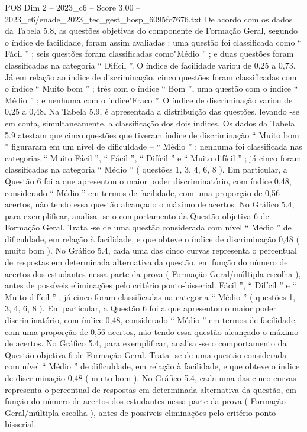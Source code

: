 \begin{textsample}{POS Dim 2 – 2023\_c6 – Score 3.00 – 2023\_c6/enade\_2023\_tec\_gest\_hosp\_6095fc7676.txt}
De acordo com os dados da Tabela 5.8, as questões objetivas do componente de Formação Geral, segundo o índice de facilidade, foram assim avaliadas : uma questão foi classificada como “ Fácil ” ; seis questões foram classificadas como"Médio ” ; e duas questões foram classificadas na categoria “ Difícil ”.
O índice de facilidade variou de 0,25 a 0,73.
Já em relação ao índice de discriminação, cinco questões foram classificadas com o índice “ Muito bom ” ; três com o índice “ Bom ”, uma questão com o índice “ Médio ” ; e nenhuma com o índice"Fraco ”.
O índice de discriminação variou de 0,25 a 0,48.
Na Tabela 5.9, é apresentada a distribuição das questões, levando -se em conta, simultaneamente, a classificação dos dois índices.
Os dados da Tabela 5.9 atestam que cinco questões que tiveram índice de discriminação “ Muito bom ” figuraram em um nível de dificuldade – “ Médio ” : nenhuma foi classificada nas categorias “ Muito Fácil ”, “ Fácil ”, “ Difícil ” e “ Muito difícil ” ; já cinco foram classificadas na categoria “ Médio ” ( questões 1, 3, 4, 6, 8 ).
Em particular, a Questão 6 foi a que apresentou o maior poder discriminatório, com índice 0,48, considerado “ Médio ” em termos de facilidade, com uma proporção de 0,56 acertos, não tendo essa questão alcançado o máximo de acertos.
No Gráfico 5.4, para exemplificar, analisa -se o comportamento da Questão objetiva 6 de Formação Geral.
Trata -se de uma questão considerada com nível “ Médio ” de dificuldade, em relação à facilidade, e que obteve o índice de discriminação 0,48 ( muito bom ).
No Gráfico 5.4, cada uma das cinco curvas representa o percentual de respostas em determinada alternativa da questão, em função do número de acertos dos estudantes nessa parte da prova ( Formação Geral/múltipla escolha ), antes de possíveis eliminações pelo critério ponto-bisserial.
Fácil ”, “ Difícil ” e “ Muito difícil ” ; já cinco foram classificadas na categoria “ Médio ” ( questões 1, 3, 4, 6, 8 ).
Em particular, a Questão 6 foi a que apresentou o maior poder discriminatório, com índice 0,48, considerado “ Médio ” em termos de facilidade, com uma proporção de 0,56 acertos, não tendo essa questão alcançado o máximo de acertos.
No Gráfico 5.4, para exemplificar, analisa -se o comportamento da Questão objetiva 6 de Formação Geral.
Trata -se de uma questão considerada com nível “ Médio ” de dificuldade, em relação à facilidade, e que obteve o índice de discriminação 0,48 ( muito bom ).
No Gráfico 5.4, cada uma das cinco curvas representa o percentual de respostas em determinada alternativa da questão, em função do número de acertos dos estudantes nessa parte da prova ( Formação Geral/múltipla escolha ), antes de possíveis eliminações pelo critério ponto-bisserial.

\end{textsample}
